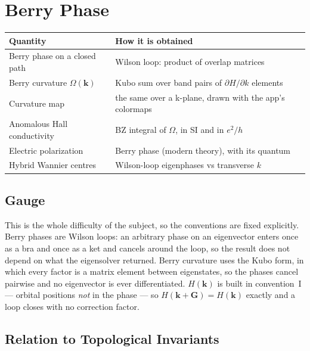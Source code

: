 \section{Berry Phase}

\menusep{}

\begin{center}
\small
\begin{tabular}{@{}lp{7.6cm}@{}}
\toprule
Quantity & How it is obtained \\
\midrule
Berry phase on a closed path & Wilson loop: product of overlap matrices \\
Berry curvature $\Omega(\mathbf{k})$ & Kubo sum over band pairs of
  $\partial H/\partial k$ elements \\
Curvature map & the same over a k-plane, drawn with the app's colormaps \\
Anomalous Hall conductivity & BZ integral of $\Omega$, in SI and in $e^2/h$ \\
Electric polarization & Berry phase (modern theory), with its quantum \\
Hybrid Wannier centres & Wilson-loop eigenphases vs transverse $k$ \\
\bottomrule
\end{tabular}
\end{center}

\subsection{Gauge}

This is the whole difficulty of the subject, so the conventions are fixed
explicitly. Berry phases are Wilson loops: an arbitrary phase on an
eigenvector enters once as a bra and once as a ket and cancels around the
loop, so the result does not depend on what the eigensolver returned. Berry
curvature uses the Kubo form, in which every factor is a matrix element
between eigenstates, so the phases cancel pairwise and no eigenvector is ever
differentiated. $H(\mathbf{k})$ is built in convention~I --- orbital positions
\emph{not} in the phase --- so $H(\mathbf{k}+\mathbf{G}) = H(\mathbf{k})$
exactly and a loop closes with no correction factor.

\subsection{Relation to Topological Invariants}

